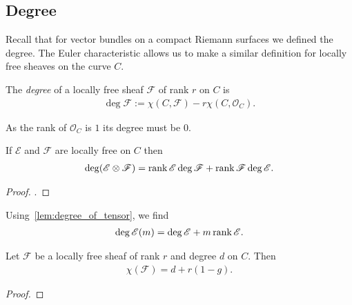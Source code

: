 \documentclass[12pt]{ociamthesis}  %
\begin{document}
\subsection{Degree}

Recall that for vector bundles on a compact Riemann surfaces we defined the
degree.  The Euler characteristic allows us to make a similar definition for
locally free sheaves on the curve $C$.

\begin{definition}
  The \emph{degree} of a locally free sheaf $\mathscr F$ of rank $r$
  on $C$ is
  \begin{align*}
    \deg \mathscr F := \chi (C,\mathscr F) - r\chi(C,\mathscr O_C).
  \end{align*}
\end{definition}

\begin{example}
  As the rank of $\mathscr O_C$ is $1$ its degree must be $0$.
\end{example}

\begin{lemma}\label{lem:degree_of_tensor}
  If $\mathscr E$ and $\mathscr F$ are locally free on $C$ then
  \begin{align*}
    \deg(\mathscr E\otimes\mathscr F) = \operatorname{rank}\mathscr E\deg\mathscr F + \operatorname{rank}\mathscr F\deg\mathscr E.
  \end{align*}
  \begin{proof}
    \cite[Exercise 8.24]{hoskins2016}.
    \missingproof
  \end{proof}
\end{lemma}

\begin{example}
  Using~\ref{lem:degree_of_tensor}, we find 
  \begin{align*}
    \deg \mathscr E(m) = \deg\mathscr E + m\operatorname{rank}\mathscr E.
  \end{align*}
\end{example}

\begin{theorem}\label{thm:riemann_roch}
  Let $\mathscr F$ be a locally free sheaf of rank $r$ and degree $d$
  on $C$. Then
  \begin{align*}
    \chi(\mathscr F) = d + r(1-g).
  \end{align*}
  \begin{proof}
    \missingproof
  \end{proof}
\end{theorem}
\end{document}
